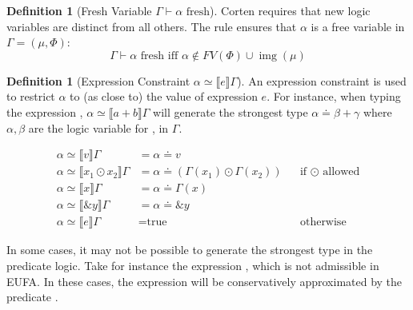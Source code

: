 \documentclass[twoside, english, final]{sdqthesis}
\newcommand{\bbracket}[1]{\llbracket #1 \rrbracket}
\DeclareMathOperator{\img}{img}
\theoremstyle{definition}
\newtheorem{definition}[theorem]{Definition}
\begin{document}
\begin{definition}[Fresh Variable $\Gamma \vdash \alpha \text{ fresh}$]

Corten requires that new logic variables are distinct from all others. The rule ensures that $\alpha$ is a free variable in $\Gamma = (\mu, \Phi)$:
  $$\Gamma \vdash \alpha \text{ fresh} \text{ iff } \alpha \notin FV(\Phi) \cup \img(\mu)$$
\end{definition}

\begin{definition}[Expression Constraint $\alpha \simeq \bbracket{e}\Gamma$]
An expression constraint is used to restrict $\alpha$ to (as close to) the value of expression $e$. For instance, 
when typing the expression , $\alpha \simeq \bbracket{a + b}\Gamma$ will generate the strongest type $\alpha \doteq \beta + \gamma$ where $\alpha, \beta$ are the logic variable for ,  in $\Gamma$. 

\begin{align*}
  \alpha \simeq \bbracket{v}\Gamma &= \alpha \doteq v
  \\ \alpha \simeq \bbracket{x_1 \odot x_2}\Gamma &= \alpha \doteq (\Gamma(x_1) \odot \Gamma(x_2)) && \text{if }\odot\text{ allowed}
  \\ \alpha \simeq \bbracket{x}\Gamma &= \alpha \doteq \Gamma(x)
  \\ \alpha \simeq \bbracket{\&y}\Gamma &= \alpha \doteq \&y
  \\ \alpha \simeq \bbracket{e}\Gamma &= \text{true} && \text{otherwise}
\end{align*}

In some cases, it may not be possible to generate the strongest type in the predicate logic. Take for instance the expression , which is not admissible in EUFA. In these cases, the expression will be conservatively approximated by the predicate .

\end{definition}
\end{document}
